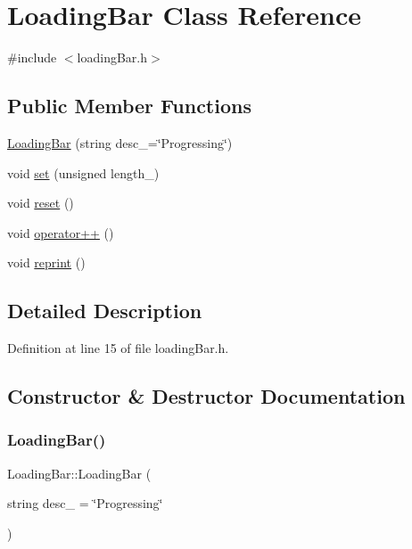 \hypertarget{class_loading_bar}{}\section{Loading\+Bar Class Reference}
\label{class_loading_bar}


{\ttfamily \#include $<$loading\+Bar.\+h$>$}

\subsection*{Public Member Functions}
\begin{DoxyCompactItemize}
\item 
\hyperlink{class_loading_bar_a0afe1dd48a942d6c5e55d7dfe81e3c68}{Loading\+Bar} (string desc\+\_\+=\char`\"{}Progressing\char`\"{})
\item 
void \hyperlink{class_loading_bar_aa36409c317164b0e74f6feafc902fa64}{set} (unsigned length\+\_\+)
\item 
void \hyperlink{class_loading_bar_a0396b27b86129c706371ff81a4991d78}{reset} ()
\item 
void \hyperlink{class_loading_bar_a438e06db16611dd92962d8ebfbb1fe77}{operator++} ()
\item 
void \hyperlink{class_loading_bar_ae9873c79a6760f8ca8d8eac56ff4d4f4}{reprint} ()
\end{DoxyCompactItemize}


\subsection{Detailed Description}


Definition at line 15 of file loading\+Bar.\+h.



\subsection{Constructor \& Destructor Documentation}
\mbox{\label{class_loading_bar_a0afe1dd48a942d6c5e55d7dfe81e3c68}} 
\subsubsection{\texorpdfstring{Loading\+Bar()}{LoadingBar()}}
{\footnotesize\ttfamily Loading\+Bar\+::\+Loading\+Bar (\begin{DoxyParamCaption}\item[{string}]{desc\+\_\+ = {\ttfamily \char`\"{}Progressing\char`\"{}} }\end{DoxyParamCaption})}



